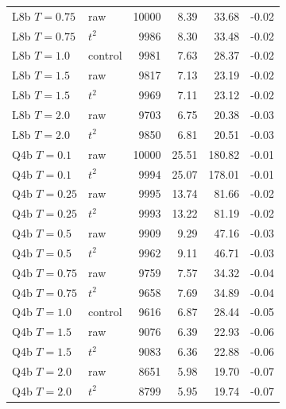 \begin{tabular}{llrrrr}
\addlinespace[2pt]
 L8b $T{=}0.75$ & raw & 10000 & 8.39 & 33.68 & -0.02 \\
 L8b $T{=}0.75$ & $t^2$ & 9986 & 8.30 & 33.48 & -0.02 \\
\addlinespace[2pt]
 L8b $T{=}1.0$ & control & 9981 & 7.63 & 28.37 & -0.02 \\
\addlinespace[2pt]
 L8b $T{=}1.5$ & raw & 9817 & 7.13 & 23.19 & -0.02 \\
 L8b $T{=}1.5$ & $t^2$ & 9969 & 7.11 & 23.12 & -0.02 \\
\addlinespace[2pt]
 L8b $T{=}2.0$ & raw & 9703 & 6.75 & 20.38 & -0.03 \\
 L8b $T{=}2.0$ & $t^2$ & 9850 & 6.81 & 20.51 & -0.03 \\
\midrule
 Q4b $T{=}0.1$ & raw & 10000 & 25.51 & 180.82 & -0.01 \\
 Q4b $T{=}0.1$ & $t^2$ & 9994 & 25.07 & 178.01 & -0.01 \\
\addlinespace[2pt]
 Q4b $T{=}0.25$ & raw & 9995 & 13.74 & 81.66 & -0.02 \\
 Q4b $T{=}0.25$ & $t^2$ & 9993 & 13.22 & 81.19 & -0.02 \\
\addlinespace[2pt]
 Q4b $T{=}0.5$ & raw & 9909 & 9.29 & 47.16 & -0.03 \\
 Q4b $T{=}0.5$ & $t^2$ & 9962 & 9.11 & 46.71 & -0.03 \\
\addlinespace[2pt]
 Q4b $T{=}0.75$ & raw & 9759 & 7.57 & 34.32 & -0.04 \\
 Q4b $T{=}0.75$ & $t^2$ & 9658 & 7.69 & 34.89 & -0.04 \\
\addlinespace[2pt]
 Q4b $T{=}1.0$ & control & 9616 & 6.87 & 28.44 & -0.05 \\
\addlinespace[2pt]
 Q4b $T{=}1.5$ & raw & 9076 & 6.39 & 22.93 & -0.06 \\
 Q4b $T{=}1.5$ & $t^2$ & 9083 & 6.36 & 22.88 & -0.06 \\
\addlinespace[2pt]
 Q4b $T{=}2.0$ & raw & 8651 & 5.98 & 19.70 & -0.07 \\
 Q4b $T{=}2.0$ & $t^2$ & 8799 & 5.95 & 19.74 & -0.07 \\
\bottomrule
\end{tabular}
